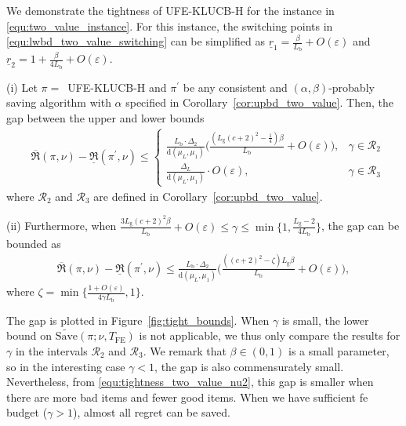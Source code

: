\documentclass[twoside,11pt]{article}
\newcommand{\calR}{\mathcal{R}}
\newcommand{\rmb}{\mathrm{b}}
\newcommand{\rmd}{\mathrm{d}}
\newcommand{\rmg}{\mathrm{g}}
\newcommand{\Tfe}{T_{\mathrm{FE}}}
\newcommand{\Saved}{\mathrm{Save}}
\newcommand{\ouralg}{\textsc{UFE-KLUCB-H}}
\begin{document}
We demonstrate the tightness of \ouralg{} for the instance in \eqref{equ:two_value_instance}. For this instance, the switching points in \eqref{equ:lwbd_two_value_switching} can be simplified as $\underline{r}_1 = \frac{\beta}{L_{\rmb}}+O(\varepsilon)$ and $\underline{r}_2 = 1\!+\!\frac{\beta}{4L_{\rmb}} + O(\varepsilon)$.
\begin{corollary}\label{cor:tightness}
    (i) Let $\pi=$\ \ouralg{} and $\pi^\prime$ be any consistent and $(\alpha,\beta)$-probably saving algorithm with $\alpha$ specified in Corollary~\ref{cor:upbd_two_value}. Then, the gap between the upper and lower bounds 
   \begin{align}
        &\overline{\mathfrak{R}}(\pi,\nu)- \underline{\mathfrak{R}}(\pi^\prime,\nu)
        \le\left\{\! \begin{array}{ll}
               \frac{L_{\rmb}\cdot \Delta_{2}}{\rmd(\mu_L,\mu_1)}\big(\frac{(L_{\rmg}(c+2)^2-\frac{1}{4})\beta}{L_{\rmb}}+O(\varepsilon)\big),& \gamma \in \mathcal{R}_2\\
                 \frac{\Delta_L}{\rmd(\mu_L,\mu_1)}\cdot O(\varepsilon), & \gamma \in \mathcal{R}_3
        \end{array}  \right. 
    \end{align}
    where $\calR_2$ and $\calR_3$ are defined in Corollary~\ref{cor:upbd_two_value}.
   
\noindent   (ii) Furthermore, when  $\frac{3L_{\rmg}(c+2)^2\beta}{L_{\rmb}} + O(\varepsilon)\leq \gamma\leq \min\big\{1,\frac{L_{\rmg}-2}{4L_{\rmb}}\big\}$, the gap can be bounded as 
    \begin{align}\label{equ:tightness_two_value_nu2}
      \overline{\mathfrak{R}}(\pi,\nu)- \underline{\mathfrak{R}}(\pi^\prime,\nu)\le \frac{L_{\rmb}\cdot \Delta_{2}}{\rmd(\mu_L,\mu_1)}\bigg(\frac{((c+2)^2-\zeta)L_{\rmg}\beta}{L_{\rmb}}+O(\varepsilon)\bigg),
    \end{align}
    where $\zeta = \min\{ \frac{1+O(\varepsilon)}{4\gamma L_{\rmb}},1\}$.
\end{corollary}
The gap is plotted in Figure~\ref{fig:tight_bounds}.
When $\gamma$ is small, the lower bound on $\widetilde{\Saved}(\pi;\nu,\Tfe)$ is not applicable, we thus only compare the results for $\gamma$ in the intervals $\calR_2$ and $\calR_3$.
We remark that $\beta \in (0,1)$ is a small parameter, so in the interesting case $\gamma<1$, the gap is also commensurately  small. 
Nevertheless, from \eqref{equ:tightness_two_value_nu2}, this gap is smaller when there are more bad items and fewer good items.
When we have sufficient \ac{fe} budget ($\gamma>1$), almost all regret can be saved.
\end{document}
